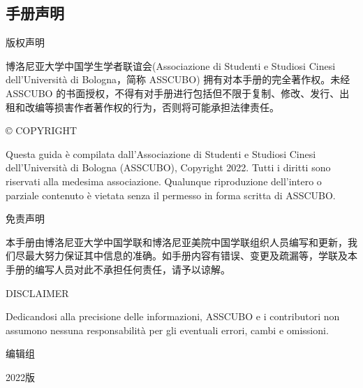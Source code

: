\begin{titlepage}
\newpage

\topmargin=-2cm                        %

\chapter*{手册声明}                 %
\pagestyle{empty}%
\thispagestyle{empty} 

\vspace{0.5cm}\centerline{\Large 版权声明}
\vspace{0.5cm}博洛尼亚大学中国学生学者联谊会(Associazione di Studenti e Studiosi Cinesi dell'Università di Bologna，简称 ASSCUBO) 拥有对本手册的完全著作权。未经ASSCUBO 的书面授权，不得有对手册进行包括但不限于复制、修改、发行、出租和改编等损害作者著作权的行为，否则将可能承担法律责任。 

\vspace{0.5cm}\centerline{\Large© COPYRIGHT}
\vspace{0.5cm}Questa guida è compilata dall'Associazione di Studenti e Studiosi Cinesi dell’Università di Bologna (ASSCUBO), Copyright 2022. Tutti i diritti sono riservati alla medesima associazione. Qualunque riproduzione dell'intero o parziale contenuto è vietata senza il permesso in forma scritta di ASSCUBO. 

\vspace{0.5cm}\centerline{\Large 免责声明}
\vspace{0.5cm}本手册由博洛尼亚大学中国学联和博洛尼亚美院中国学联组织人员编写和更新，我们尽最大努力保证其中信息的准确。如手册内容有错误、变更及疏漏等，学联及本手册的编写人员对此不承担任何责任，请予以谅解。

\vspace{0.5cm}\centerline{\Large DISCLAIMER}
\vspace{0.5cm}Dedicandosi alla precisione delle informazioni, ASSCUBO e i contributori non assumono nessuna responsabilità per gli eventuali errori, cambi e omissioni. 

\newpage

\topmargin=0cm 
\vspace{1cm}\centerline{\Large 编辑组} 
\vspace{1cm}\centerline{2022版} 
\begin{itemize}


\end{itemize}
\end{titlepage}
